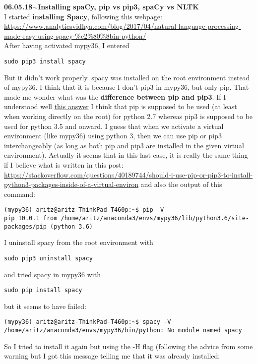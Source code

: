 \documentclass[11pt,a4paper]{article}
\newenvironment{loggentry}[2]%
{\noindent\textbf{#1}\hspace{1cm}$\mathbf{\sim}$\text{ }\textbf{#2}\\}{\vspace{0.5cm}}
\begin{document}
\begin{loggentry}{06.05.18}{Installing spaCy, pip vs pip3,  spaCy vs NLTK}
I started \textbf{installing Spacy}, following this webpage:\\
\url{https://www.analyticsvidhya.com/blog/2017/04/natural-language-processing-made-easy-using-spacy-%e2%80%8bin-python/}\\
After having activated mypy36, I entered
\begin{verbatim}
sudo pip3 install spacy
\end{verbatim}
But it didn't work properly. spacy was installed on the root environment instead of mypy36. I think that it is because I don't pip3 in mypy36, but only pip. That made me wonder what was the \textbf{difference between pip and pip3}. If I understood well \href{https://www.quora.com/What-is-difference-between-pip-and-pip3}{this answer} I think that pip is supposed to be used (at least when working directly on the root) for python 2.7 whereas pip3 is supposed to be used for python 3.5 and onward. I guess that when we activate a virtual environment (like mypy36) using python 3, then we can use pip or pip3 interchangeably (as long as both pip and pip3 are installed in the given virtual environment). Actually it seems that in this last case, it is really the same thing if I believe what is written in this post:\\
\url{https://stackoverflow.com/questions/40189744/should-i-use-pip-or-pip3-to-install-python3-packages-inside-of-a-virtual-environ}
and also the output of this command:\\
\begin{verbatim}
(mypy36) aritz@aritz-ThinkPad-T460p:~$ pip -V
pip 10.0.1 from /home/aritz/anaconda3/envs/mypy36/lib/python3.6/site-packages/pip (python 3.6)
\end{verbatim}
I uninstall spacy from the root environment with
\begin{verbatim}
sudo pip3 uninstall spacy
\end{verbatim}
and tried spacy in mypy36 with
\begin{verbatim}
sudo pip install spacy
\end{verbatim}
but it seems to have failed:\\
\begin{verbatim}
(mypy36) aritz@aritz-ThinkPad-T460p:~$ spacy -V
/home/aritz/anaconda3/envs/mypy36/bin/python: No module named spacy
\end{verbatim}
So I tried to install it again but using the -H flag (following the advice from some warning but I got this message telling me that it was already installed:

\end{loggentry}
\end{document}
